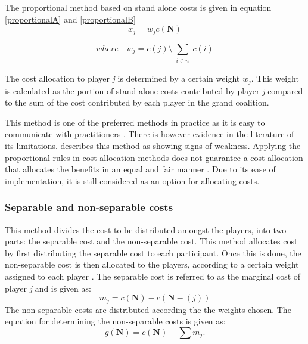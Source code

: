  The proportional method based on stand alone costs is given in equation \ref{proportionalA} and \ref{proportionalB}
 \begin{equation}
 \label{proportionalA}
 x_j = w_j c(\textbf{N})
 \end{equation}
 
 \begin{equation}
 \label{proportionalB}
  where \quad w_j = c({j}) \setminus \sum_{\substack{i\in n}} c({i})
 \end{equation}

The cost allocation to player \textit{j} is determined by a certain weight \( w_j\). This weight is calculated as the portion of stand-alone costs contributed by player \textit{j} compared to the sum of the cost contributed by each player in the grand coalition.

This method is one of the preferred methods in practice as it is easy to communicate with practitioners \citep{guajardo2016review}.
There is however evidence in the literature of its limitations. \citep{guajardo2016review} describes this method as showing signs of weakness. Applying the proportional rules in cost allocation methods does not guarantee a cost allocation that allocates the benefits in an equal and fair manner \citep{lozano2013cooperative}. Due to its ease of implementation, it is still considered as an option for allocating costs.   

\subsubsection{Separable and non-separable costs}
This method divides the cost to be distributed amongst the players, into two parts: the separable cost and the non-separable cost. This method allocates cost by first distributing the separable cost to each participant. Once this is done, the non-separable cost is then allocated to the players, according to a certain weight assigned to each player \citep{frisk2010cost}.  The separable cost is referred to as the marginal cost of player \textit{j} and is given as:
\begin{equation}
m_j = c(\textbf{N}) - c(\textbf{N} - (j))
\end{equation}
 The non-separable costs are distributed according the the weights chosen. The equation for determining the non-separable costs is given as:
 \begin{equation}
 g(\textbf{N}) = c(\textbf{N}) - \sum m_j.
 \end{equation}

